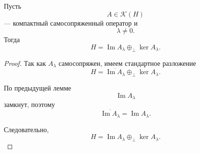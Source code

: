 \begin{theorem}[Фредгольма]
	Пусть
	\[
	A\in\mathcal K(H)
	\]
	--- компактный самосопряженный оператор и
	\[
	\lambda\neq0.
	\]
	Тогда
	\[
	H
	=
	\operatorname{Im}A_\lambda
	\oplus_{\perp}
	\ker A_\lambda.
	\]
\end{theorem}

\begin{proof}
	Так как \(A_\lambda\) самосопряжен, имеем стандартное разложение
	\[
	H
	=
	\overline{\operatorname{Im}A_\lambda}
	\oplus_{\perp}
	\ker A_\lambda.
	\]
	
	По предыдущей лемме
	\[
	\operatorname{Im}A_\lambda
	\]
	замкнут, поэтому
	\[
	\overline{\operatorname{Im}A_\lambda}
	=
	\operatorname{Im}A_\lambda.
	\]
	
	Следовательно,
	\[
	\boxed{
		H
		=
		\operatorname{Im}A_\lambda
		\oplus_{\perp}
		\ker A_\lambda.
	}
	\]
\end{proof}